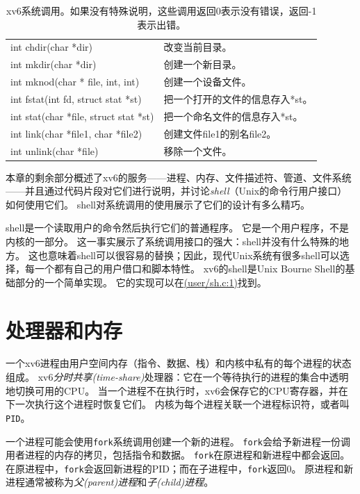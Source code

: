 \begin{table}[htbp]
\begin{tabular}{ll}
        int chdir(char *dir)  & 改变当前目录。  \\
        int mkdir(char *dir)  & 创建一个新目录。    \\
        int mknod(char * file, int, int)   & 创建一个设备文件。  \\
        int fstat(int fd, struct stat *st)       & 把一个打开的文件的信息存入*st。  \\
        int stat(char *file, struct stat *st) &  把一个命名文件的信息存入*st。\\
        int link(char *file1, char *file2)    & 创建文件file1的别名file2。    \\
        int unlink(char *file)& 移除一个文件。 \\
    \end{tabular}
    \caption{xv6系统调用。如果没有特殊说明，这些调用返回0表示没有错误，返回-1表示出错。}
    \label{t1-1}
\end{table}

本章的剩余部分概述了xv6的服务——进程、内存、文件描述符、管道、文件系统——并且通过代码片段对它们进行说明，并讨论\emph{shell}（Unix的命令行用户接口）如何使用它们。
shell对系统调用的使用展示了它们的设计有多么精巧。

shell是一个读取用户的命令然后执行它们的普通程序。
它是一个用户程序，不是内核的一部分。
这一事实展示了系统调用接口的强大：shell并没有什么特殊的地方。
这也意味着shell可以很容易的替换；因此，现代Unix系统有很多shell可以选择，每一个都有自己的用户借口和脚本特性。
xv6的shell是Unix Bourne Shell的基础部分的一个简单实现。
它的实现可以在\href{https://github.com/mit-pdos/xv6-riscv/blob/riscv//user/sh.c#L1}{(user/sh.c:1)}找到。

\section{处理器和内存}

一个xv6进程由用户空间内存（指令、数据、栈）和内核中私有的每个进程的状态组成。
xv6\emph{分时共享(time-share)}处理器：它在一个等待执行的进程的集合中透明地切换可用的CPU。
当一个进程不在执行时，xv6会保存它的CPU寄存器，并在下一次执行这个进程时恢复它们。
内核为每个进程关联一个进程标识符，或者叫\texttt{PID}。

一个进程可能会使用\texttt{fork}系统调用创建一个新的进程。
\texttt{fork}会给予新进程一份调用者进程的内存的拷贝，包括指令和数据。
\texttt{fork}在原进程和新进程中都会返回。
在原进程中，\texttt{fork}会返回新进程的PID；而在子进程中，\texttt{fork}返回0。
原进程和新进程通常被称为\emph{父(parent)进程}和\emph{子(child)进程}。

